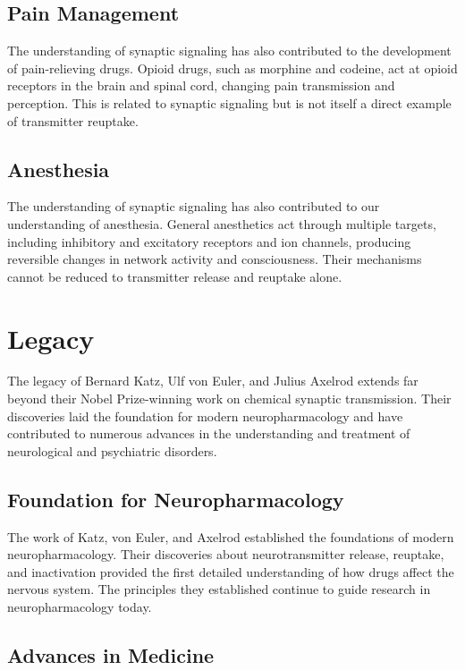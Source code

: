 \subsection{Pain Management}

The understanding of synaptic signaling has also contributed to the development of pain-relieving drugs. Opioid drugs, such as morphine and codeine, act at opioid receptors in the brain and spinal cord, changing pain transmission and perception. This is related to synaptic signaling but is not itself a direct example of transmitter reuptake.

\subsection{Anesthesia}

The understanding of synaptic signaling has also contributed to our understanding of anesthesia. General anesthetics act through multiple targets, including inhibitory and excitatory receptors and ion channels, producing reversible changes in network activity and consciousness. Their mechanisms cannot be reduced to transmitter release and reuptake alone.

\section{Legacy}

The legacy of Bernard Katz, Ulf von Euler, and Julius Axelrod extends far beyond their Nobel Prize-winning work on chemical synaptic transmission. Their discoveries laid the foundation for modern neuropharmacology and have contributed to numerous advances in the understanding and treatment of neurological and psychiatric disorders.

\subsection{Foundation for Neuropharmacology}

The work of Katz, von Euler, and Axelrod established the foundations of modern neuropharmacology. Their discoveries about neurotransmitter release, reuptake, and inactivation provided the first detailed understanding of how drugs affect the nervous system. The principles they established continue to guide research in neuropharmacology today.

\subsection{Advances in Medicine}

